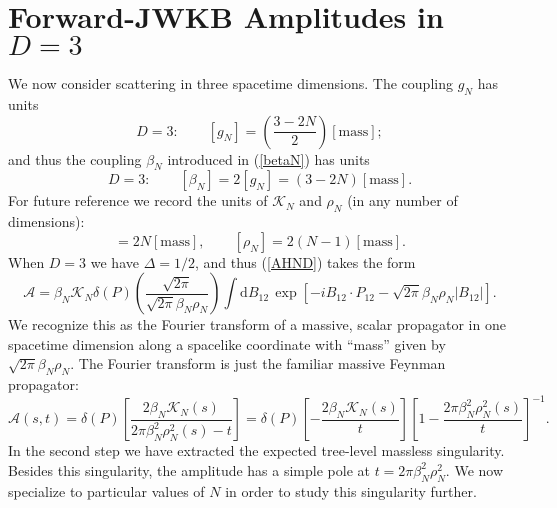 \section{Forward-JWKB Amplitudes in $D = 3$\label{sec4}}
We now consider scattering in three spacetime dimensions. The coupling $g_{N}$ has units
\begin{equation}
	D = 3: \qquad [g_{N}] = \left( \frac{3 - 2N}{2} \right) [\text{mass}];
\end{equation}
and thus the coupling $\beta_{N}$ introduced in (\ref{betaN}) has units
\begin{equation}
	D = 3: \qquad [\beta_{N}] = 2[g_{N}] = \left(3 - 2N \right) [\text{mass}].
\end{equation}
For future reference we record the units of $\mathcal{K}_{N}$ and $\rho_{N}$ (in any number of dimensions):
\begin{equation}
	[\mathcal{K}_{N}] = 2N [\text{mass}], \qquad [\rho_{N}] = 2(N - 1) [\text{mass}].
\end{equation}
When $D = 3$ we have $\Delta = 1/2$, and thus (\ref{AHND}) takes the form
\begin{equation}
	\mathcal{A} = \beta_{N} \mathcal{K}_{N} \delta(P) \left( \frac{\sqrt{2 \pi}}{\sqrt{2 \pi} \beta_{N} \rho_{N}} \right) \int \mathrm{d}B_{1 2} \, \exp{\left[-i B_{12} \cdot P_{12} - \sqrt{2\pi} \beta_{N} \rho_{N} \vert B_{1 2} \vert \right]}.
\end{equation}
We recognize this as the Fourier transform of a massive, scalar propagator in one spacetime dimension along a spacelike coordinate with ``mass'' given by $\sqrt{2\pi} \beta_{N} \rho_{N}$. The Fourier transform is just the familiar massive Feynman propagator:
\begin{equation}
	\mathcal{A}(s, t) = \delta(P) \left[ \frac{2 \beta_{N} \mathcal{K}_{N}(s)}{2 \pi \beta_{N}^{2} \rho_{N}^{2}(s) - t} \right] = \delta(P) \left[- \frac{2 \beta_{N} \mathcal{K}_{N}(s)}{t} \right] \left[ 1 - \frac{2 \pi \beta_{N}^{2} \rho_{N}^{2}(s)}{t} \right]^{-1}.
	\label{AHN3}
\end{equation}
In the second step we have extracted the expected tree-level massless singularity. Besides this singularity, the amplitude has a simple pole at $t = 2 \pi \beta_{N}^{2} \rho_{N}^{2}$. We now specialize to particular values of $N$ in order to study this singularity further.
